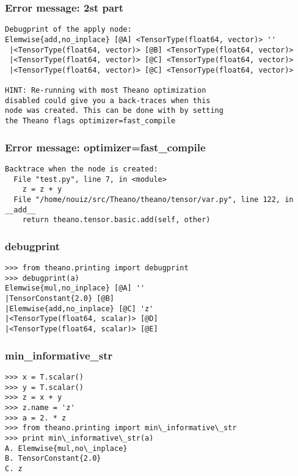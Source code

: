 \documentclass[utf8x,xcolor=pdftex,dvipsnames,table]{beamer}
\begin{document}
\begin{frame}[fragile]
  \frametitle{Error message: 2st part}

\begin{lstlisting}
Debugprint of the apply node: 
Elemwise{add,no_inplace} [@A] <TensorType(float64, vector)> ''   
 |<TensorType(float64, vector)> [@B] <TensorType(float64, vector)>
 |<TensorType(float64, vector)> [@C] <TensorType(float64, vector)>
 |<TensorType(float64, vector)> [@C] <TensorType(float64, vector)>

HINT: Re-running with most Theano optimization
disabled could give you a back-traces when this
node was created. This can be done with by setting
the Theano flags optimizer=fast_compile
\end{lstlisting}
\end{frame}

\begin{frame}[fragile]
  \frametitle{Error message: optimizer=fast\_compile}

\begin{lstlisting}
Backtrace when the node is created:
  File "test.py", line 7, in <module>
    z = z + y
  File "/home/nouiz/src/Theano/theano/tensor/var.py", line 122, in __add__
    return theano.tensor.basic.add(self, other)

\end{lstlisting}
\end{frame}

\begin{frame}[fragile]
  \frametitle{debugprint}

\begin{lstlisting}
>>> from theano.printing import debugprint
>>> debugprint(a)
Elemwise{mul,no_inplace} [@A] ''
|TensorConstant{2.0} [@B]
|Elemwise{add,no_inplace} [@C] 'z'
|<TensorType(float64, scalar)> [@D]
|<TensorType(float64, scalar)> [@E]
\end{lstlisting}
\end{frame}

\begin{frame}[fragile]
  \frametitle{min\_informative\_str}

\begin{lstlisting}
>>> x = T.scalar()
>>> y = T.scalar()
>>> z = x + y
>>> z.name = 'z'
>>> a = 2. * z
>>> from theano.printing import min\_informative\_str
>>> print min\_informative\_str(a)
A. Elemwise{mul,no\_inplace}
B. TensorConstant{2.0}
C. z
\end{lstlisting}
\end{frame}
\end{document}
